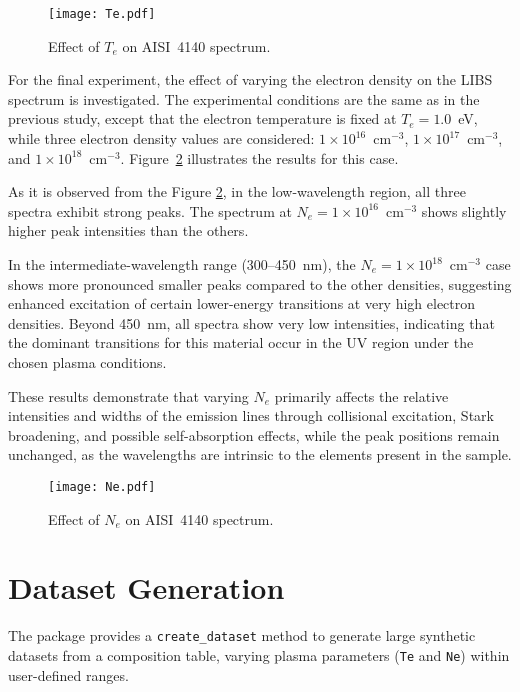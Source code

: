 \documentclass[12pt,a4paper]{article}
\begin{document}
		
	\begin{figure}[h!]
		\centering
		\texttt{[image: Te.pdf]}
		\caption{Effect of $T_e$ on AISI~4140 spectrum.}
		\label{fig:Effect of T_e}
	\end{figure}
	
	For the final experiment, the effect of varying the electron density on the LIBS spectrum is investigated. The experimental conditions are the same as in the previous study, except that the electron temperature is fixed at $T_e = 1.0$~eV, while three electron density values are considered: $1\times10^{16}$~cm$^{-3}$, $1\times10^{17}$~cm$^{-3}$, and $1\times10^{18}$~cm$^{-3}$. Figure~\ref{fig:Effect of N_e} illustrates the results for this case.
	
	 As it is observed from the Figure \ref{fig:Effect of N_e}, in the low-wavelength region, all three spectra exhibit strong peaks. The spectrum at $N_e = 1\times 10^{16}$~cm$^{-3}$ shows slightly higher peak intensities than the others.
	
	In the intermediate-wavelength range (300--450~nm), the $N_e = 1\times 10^{18}$~cm$^{-3}$ case shows more pronounced smaller peaks compared to the other densities, suggesting enhanced excitation of certain lower-energy transitions at very high electron densities. Beyond 450~nm, all spectra show very low intensities, indicating that the dominant transitions for this material occur in the UV region under the chosen plasma conditions.
	
	These results demonstrate that varying $N_e$ primarily affects the relative intensities and widths of the emission lines through collisional excitation, Stark broadening, and possible self-absorption effects, while the peak positions remain unchanged, as the wavelengths are intrinsic to the elements present in the sample.
	
	
	\begin{figure}[h!]
		\centering
		\texttt{[image: Ne.pdf]}
		\caption{Effect of $N_e$ on AISI~4140 spectrum.}
		\label{fig:Effect of N_e}
	\end{figure}

	
	\section{Dataset Generation}
	The package provides a \texttt{create\_dataset} method to generate large synthetic datasets from a composition table, varying plasma parameters (\texttt{Te} and \texttt{Ne}) within user-defined ranges.
	
\end{document}
